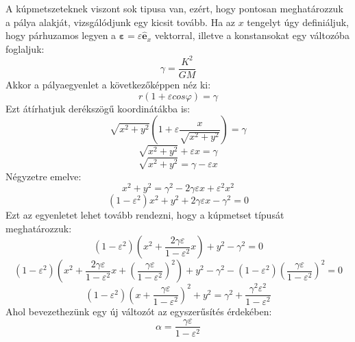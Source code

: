 \documentclass[a4paper,12pt]{article}
\begin{document}
A kúpmetszeteknek viszont sok tipusa van, ezért, hogy pontosan meghatározzuk a pálya alakját, vizsgálódjunk egy kicsit tovább.
Ha az $x$ tengelyt úgy definiáljuk, hogy párhuzamos legyen a $\boldsymbol{\varepsilon} = \varepsilon \hat{\mathbf{e}}_x$ vektorral, illetve a konstansokat egy változóba foglaljuk:
\begin{equation}
    \gamma = \frac{K^2}{GM}
\end{equation}
Akkor a pályaegyenlet a következőképpen néz ki:
\begin{equation}
    r (1 + \varepsilon cos\varphi) = \gamma
\end{equation}
Ezt átírhatjuk derékszögű koordinátákba is:
\begin{equation}
    \sqrt{x^2 + y^2} (1 + \varepsilon \frac{x}{\sqrt{x^2 + y^2}}) = \gamma
\end{equation}
\begin{equation}
    \sqrt{x^2 + y^2} + \varepsilon x = \gamma
\end{equation}
\begin{equation}
    \sqrt{x^2 + y^2} = \gamma - \varepsilon x
\end{equation}
Négyzetre emelve:
\begin{equation}
    x^2 + y^2 = \gamma^2 - 2 \gamma \varepsilon x + \varepsilon^2 x^2
\end{equation}
\begin{equation}
    (1 - \varepsilon^2) x^2 + y^2 + 2 \gamma \varepsilon x - \gamma^2 = 0
\end{equation}
Ezt az egyenletet lehet tovább rendezni, hogy a kúpmetset típusát meghatározzuk:
\begin{equation}
    (1 - \varepsilon^2) (x^2 + \frac{2 \gamma \varepsilon}{1 - \varepsilon^2} x) + y^2 - \gamma^2 = 0
\end{equation}
\begin{equation}
    (1 - \varepsilon^2) \left(x^2 + \frac{2 \gamma \varepsilon}{1 - \varepsilon^2} x + \left(\frac{\gamma \varepsilon}{1 - \varepsilon^2}\right)^2\right) + y^2 - \gamma^2 - (1 - \varepsilon^2) \left(\frac{\gamma \varepsilon}{1 - \varepsilon^2}\right)^2 = 0
\end{equation}
\begin{equation}
    (1 - \varepsilon^2) \left(x + \frac{\gamma \varepsilon}{1 - \varepsilon^2}\right)^2 + y^2 = \gamma^2 + \frac{\gamma^2 \varepsilon^2}{1 - \varepsilon^2}
\end{equation}
Ahol bevezethezünk egy új változót az egyszerűsítés érdekében:
\begin{equation}
    \alpha = \frac{\gamma \varepsilon}{1 - \varepsilon^2}
\end{equation}
\end{document}
